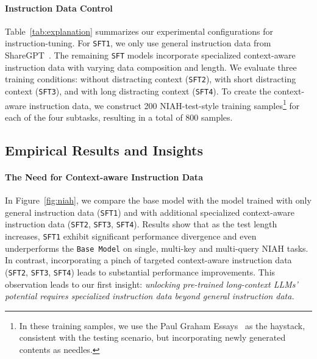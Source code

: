 \noindent\paragraph{Instruction Data Control}
Table~\ref{tab:explanation} summarizes our experimental configurations for instruction-tuning.
For \texttt{SFT1}, we only use general instruction data from ShareGPT~\cite{vicuna2023}.
The remaining \texttt{SFT} models incorporate specialized context-aware instruction data with varying data composition and length.
We evaluate three training conditions: without distracting context (\texttt{SFT2}), with short distracting context (\texttt{SFT3}), and with long distracting context (\texttt{SFT4}).
To create the context-aware instruction data, we construct 200 NIAH-test-style training samples\footnote{In these training samples, we use the Paul Graham Essays~\cite{kamradt2023needle} as the haystack, consistent with the testing scenario, but incorporating newly generated contents as needles.} for each of the four subtasks, resulting in a total of 800 samples.

\subsection{Empirical Results and Insights}
\paragraph{The Need for Context-aware Instruction Data}
In Figure~\ref{fig:niah}, we compare the base model with the model trained with only general instruction data (\texttt{SFT1}) and with additional specialized context-aware instruction data (\texttt{SFT2}, \texttt{SFT3}, \texttt{SFT4}).
Results show that as the test length increases, \texttt{SFT1} exhibit significant performance divergence and even underperforms the \texttt{Base Model} on single, multi-key and multi-query NIAH tasks.
In contrast, incorporating a pinch of targeted context-aware instruction data (\texttt{SFT2}, \texttt{SFT3}, \texttt{SFT4}) leads to substantial performance improvements. 
This observation leads to our first insight: \textit{unlocking pre-trained long-context LLMs' potential requires specialized instruction data beyond general instruction data.}

